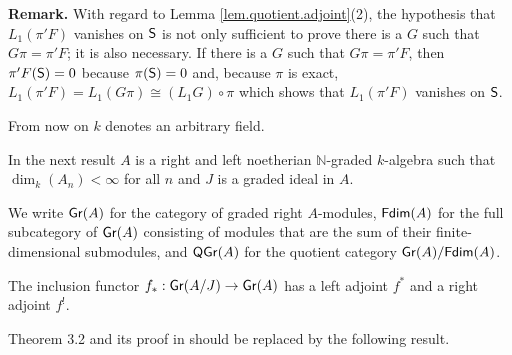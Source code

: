 \documentclass[10pt]{amsart}
\numberwithin{equation}{section}
\def\NN{{\mathbb N}}
\def\dim{\operatorname{dim}}
\def\Fdim{{\sf Fdim}}
\def\Gr{{\sf Gr}}
\def\QGr{\operatorname{\sf QGr}}
\def\sS{{\sf S}}
\begin{document}
{\bf Remark.}
With regard to Lemma \ref{lem.quotient.adjoint}(2), 
the hypothesis that $L_1(\pi'F)$ vanishes on $\sS$ is not only sufficient to prove there is a $G$ such that $G\pi=\pi'F$;
it is also necessary. If there is a $G$ such that $G\pi=\pi'F$, then $\pi'F(\sS)=0$ because $\pi(\sS)=0$ and, because $\pi$ is exact, $L_1(\pi'F) =  L_1(G\pi) \cong (L_1G) \circ \pi$ which shows that $L_1(\pi'F)$ vanishes on $\sS$. 

\bigskip

From now on $k$ denotes an arbitrary field.
 
In the next result $A$ is a right and left noetherian $\NN$-graded $k$-algebra such
that $\dim_k(A_n)< \infty$ for all $n$ and $J$ is a graded ideal in $A$. 

We write $\Gr(A)$ for the category of graded right $A$-modules, $\Fdim(A)$ for the full subcategory of $\Gr(A)$
consisting of modules that are the sum of their finite-dimensional submodules, and $\QGr(A)$ for the quotient category 
$\Gr(A)/\Fdim(A)$. 


The inclusion functor $f_*:\Gr(A/J) \to \Gr(A)$ has a left adjoint $f^*$ and a right adjoint $f^!$. 



Theorem 3.2 and its proof in \cite{S} should be replaced by the following result.
\end{document}
